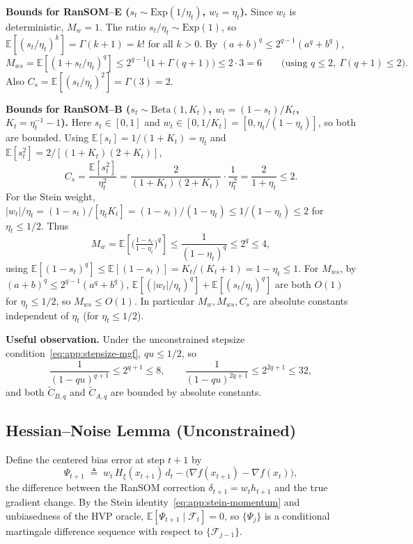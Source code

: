 \documentclass{article}
\theoremstyle{plain}
\theoremstyle{definition}
\theoremstyle{remark}
\begin{document}
\smallskip\noindent\textbf{Bounds for RanSOM--E ($s_t \sim \mathrm{Exp}(1/\eta_t)$, $w_t = \eta_t$).}
Since $w_t$ is deterministic, $M_w = 1$. The ratio $s_t/\eta_t \sim
\mathrm{Exp}(1)$, so $\mathbb{E}[(s_t/\eta_t)^k] = \Gamma(k+1) = k!$ for
all $k > 0$. By $(a+b)^q \leq 2^{q-1}(a^q + b^q)$,
\[
  M_{ws} = \mathbb{E}[(1 + s_t/\eta_t)^q]
  \leq 2^{q-1}\bigl(1 + \Gamma(q+1)\bigr)
  \leq 2\cdot 3 = 6
  \qquad \text{(using } q \leq 2,\ \Gamma(q+1) \leq 2\text{).}
\]
Also $C_s = \mathbb{E}[(s_t/\eta_t)^2] = \Gamma(3) = 2$.

\smallskip\noindent\textbf{Bounds for RanSOM--B ($s_t \sim \mathrm{Beta}(1, K_t)$, $w_t = (1-s_t)/K_t$, $K_t = \eta_t^{-1} - 1$).}
Here $s_t \in [0,1]$ and $w_t \in [0, 1/K_t] = [0, \eta_t/(1-\eta_t)]$,
so both are bounded. Using $\mathbb{E}[s_t] = 1/(1+K_t) = \eta_t$ and
$\mathbb{E}[s_t^2] = 2/[(1+K_t)(2+K_t)]$,
\[
  C_s = \frac{\mathbb{E}[s_t^2]}{\eta_t^2}
  = \frac{2}{(1+K_t)(2+K_t)}\cdot \frac{1}{\eta_t^2}
  = \frac{2}{1 + \eta_t}
  \leq 2.
\]
For the Stein weight, $|w_t|/\eta_t = (1-s_t)/[\eta_t K_t] =
(1-s_t)/(1-\eta_t) \leq 1/(1-\eta_t) \leq 2$ for $\eta_t \leq 1/2$. Thus
\[
  M_w = \mathbb{E}\!\left[\bigl(\tfrac{1-s_t}{1-\eta_t}\bigr)^q\right]
  \leq \frac{1}{(1-\eta_t)^q} \leq 2^q \leq 4,
\]
using $\mathbb{E}[(1-s_t)^q] \leq \mathbb{E}[(1-s_t)] = K_t/(K_t+1) = 1 -
\eta_t \leq 1$. For $M_{ws}$, by $(a+b)^q \leq 2^{q-1}(a^q+b^q)$,
$\mathbb{E}[(|w_t|/\eta_t)^q] + \mathbb{E}[(s_t/\eta_t)^q]$ are both
$O(1)$ for $\eta_t \leq 1/2$, so $M_{ws} \leq O(1)$. In particular
$M_w, M_{ws}, C_s$ are absolute constants independent of $\eta_t$ (for
$\eta_t \leq 1/2$). 

\smallskip\noindent\textbf{Useful observation.}
Under the unconstrained stepsize condition~\eqref{eq:app:stepsize-mgf},
$qu \leq 1/2$, so
\[
  \frac{1}{(1-qu)^{q+1}} \leq 2^{q+1} \leq 8,
  \qquad
  \frac{1}{(1-qu)^{2q+1}} \leq 2^{2q+1} \leq 32,
\]
and both $\widetilde C_{B,q}$ and $\widetilde C_{A,q}$ are bounded by
absolute constants.


\subsection{Hessian--Noise Lemma (Unconstrained)}
\label{app:hessian-noise}

Define the centered bias error at step $t+1$ by
\begin{equation}
  \Psi_{t+1}
  \;\triangleq\;
  w_t\, H_\xi(x_{t+1})\, d_t
    - \bigl(\nabla f(x_{t+1}) - \nabla f(x_t)\bigr),
  \label{eq:app:Psi-def}
\end{equation}
the difference between the RanSOM correction $\delta_{t+1} = w_t
h_{t+1}$ and the true gradient change. By the Stein
identity~\eqref{eq:app:stein-momentum} and unbiasedness of the HVP
oracle, $\mathbb{E}[\Psi_{t+1} \mid \mathcal{F}_t] = 0$, so $\{\Psi_j\}$
is a conditional martingale difference sequence with respect to
$\{\mathcal{F}_{j-1}\}$.
\end{document}
